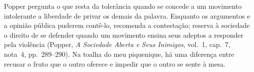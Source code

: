Popper pergunta o que resta da tolerância quando se concede a um movimento intolerante a liberdade de privar os demais da palavra.
Enquanto os argumentos e a opinião pública puderem contê-lo, recomenda a contestação; reserva à sociedade o direito de se defender quando um movimento ensina seus adeptos a responder pela violência (Popper, \textit{A Sociedade Aberta e Seus Inimigos}, vol.~1, cap.~7, nota~4, pp.~289--290).
Na toalha do meu piquenique, há uma diferença entre recusar o fruto que o outro oferece e impedir que o outro se sente à mesa.

